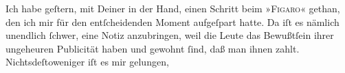 \pstart
           Ich habe geſtern, mit Deiner \label{K_L02767-2v}\label{K_L02767-2} in der Hand, einen Schritt beim »\textsc{Figaro}« gethan, den ich mir für \strikeout{\textcolor{gray}{einen}} den entſcheidenden Moment {\pb}aufgeſpart hatte.
               Da iſt es nämlich unendlich ſchwer,  eine Notiz
               anzubringen, weil die Leute das
               Bewußtſein ihrer ungeheuren Publicität haben und gewohnt ſind, daß man  ihnen zahlt. Nichtsdeſtoweniger iſt es mir gelungen,
